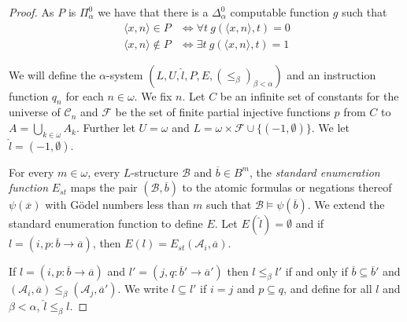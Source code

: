 \documentclass{amsart}
\newcommand\+[1]{\mathcal{#1}}
\renewcommand\*[1]{\mathbf{#1}}
\renewcommand\=[1]{\text{#1}}
\renewcommand\*[1]{\mathbf{#1}}
\newcommand{\ol}[1]{\overline{#1}}
\newcommand{\mc}[1]{\mathcal{#1}}
\newcommand{\ra}{\rightarrow}
\begin{document}
\begin{proof}
As $P$ is $\Pi_{\alpha}^0$ we have that there is a $\Delta_{\alpha}^0$ computable function $g$ such that
\begin{align*}
    \langle x,n\rangle \in P &\iff \forall t\ g(\langle x,n\rangle, t)=0\\
    \langle x,n\rangle \not \in P &\iff \exists t\ g(\langle x,n\rangle, t)=1
\end{align*}

We will define the $\alpha$-system $(L,U,\hat l, P,E,(\leq_\beta)_{\beta<\alpha})$ and an instruction function $q_n$ for each $n\in \omega$. We fix $n$. Let $C$ be an infinite set of constants for the universe of $\mc C_n$ and $\mc F$ be the set of finite partial injective functions $p$ from $C$ to $A=\bigcup_{k\in \omega} A_k$. Further let $U=\omega$ and $L=\omega\times \mc F \cup \{(-1,\emptyset)\}$. We let $\hat l=(-1,\emptyset)$.

For every $m\in \omega$, every $L$-structure $\mc B$ and $\ol b\in B^{m}$, the \emph{standard enumeration function} $E_{st}$ maps the pair $(\mc B,\ol b)$ to the atomic formulas or negations thereof $\psi(\ol x)$ with G\"odel numbers less than $m$ such that $\mc B\models \psi(\ol b)$. We extend the standard enumeration function to define $E$. Let $E(\hat l)=\emptyset$ and if $l=(i,p:\ol b\ra \ol a)$, then $E(l)=E_{st}(\mc A_i, \ol a)$.

If $l=(i,p:\ol b \ra \ol a)$ and $l'=(j,q:\ol b'\ra \ol a')$ then $l\leq_\beta l'$ if and only if $\ol b\subseteq \ol b'$ and $(\mc A_i,\ol a)\leq_\beta (\mc A_j,\ol a')$. We write $l\subseteq l'$ if $i=j$ and $p\subseteq q$, and define for all $l$ and $\beta<\alpha$, $\hat l\leq_\beta l$.


\end{proof}
\end{document}
